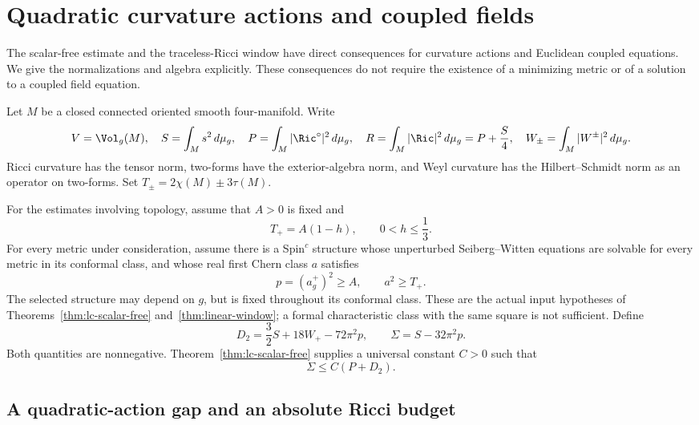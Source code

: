 \section{Quadratic curvature actions and coupled fields}
\label{sec:quadratic-matter}

The scalar-free estimate and the traceless-Ricci window have direct
consequences for curvature actions and Euclidean coupled equations.  We
give the normalizations and algebra explicitly.  These consequences do
not require the existence of a minimizing metric or of a solution to a
coupled field equation.

Let $M$ be a closed connected oriented smooth four-manifold.  Write
\[
 V=\Vol_g(M),\quad S=\int_Ms^2\,d\mu_g,\quad
 P=\int_M|\Ric^\circ|^2\,d\mu_g,\quad
 R=\int_M|\Ric|^2\,d\mu_g=P+\frac S4,
 \quad W_\pm=\int_M|W^\pm|^2\,d\mu_g.
\]
Ricci curvature has the tensor norm, two-forms have the exterior-algebra
norm, and Weyl curvature has the Hilbert--Schmidt norm as an operator on
two-forms.  Set $T_\pm=2\chi(M)\pm3\tau(M)$.

For the estimates involving topology, assume that $A>0$ is fixed and
\begin{equation}\label{eq:qm-supply}
 T_+=A(1-h),\qquad 0<h\le\frac13.
\end{equation}
For every metric under consideration, assume there is a Spin$^c$
structure whose unperturbed Seiberg--Witten equations are solvable for
every metric in its conformal class, and whose real first Chern class
$a$ satisfies
\[
 p=(a_g^+)^2\ge A,\qquad a^2\ge T_+.
\]
The selected structure may depend on $g$, but is fixed throughout its
conformal class.  These are the actual input hypotheses of
Theorems~\ref{thm:lc-scalar-free} and~\ref{thm:linear-window}; a
formal characteristic class with the same square is not sufficient.
Define
\[
 D_2=\frac32S+18W_+-72\pi^2p,\qquad
 \Sigma=S-32\pi^2p.
\]
Both quantities are nonnegative.  Theorem~\ref{thm:lc-scalar-free}
supplies a universal constant $C>0$ such that
\begin{equation}\label{eq:qm-slack}
 \Sigma\le C(P+D_2).
\end{equation}

\subsection{A quadratic-action gap and an absolute Ricci budget}

